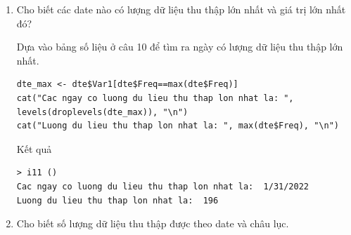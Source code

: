 \documentclass[a4paper]{article}
\theoremstyle{definition}
\begin{document}
\begin{enumerate}[1)]
Đầu tiên chúng ta sẽ tạo một bảng số liệu thống kê dữ liệu theo ngày, sau đó dựa vào bảng số liệu trên để tìm ra ngày có lượng dữ liệu thu thập nhỏ nhất.
\begin{lstlisting}
dte <- table(dataFile$date)
dte <- as.data.frame(dte)
dte_min <- dte$Var1[dte$Freq==min(dte$Freq)]
cat("Cac ngay co luong du lieu thu thap nho nhat la: ", levels(droplevels(dte_min)), "\n")
cat("Luong du lieu thu thap nho nhat la: ", min(dte$Freq), "\n")
\end{lstlisting}
Kết quả
\begin{lstlisting}
> i10 ()
Cac ngay co luong du lieu thu thap nho nhat la:  1/23/2020 2/18/2020
Luong du lieu thu thap nho nhat la:  10 
\end{lstlisting}

\item Cho biết các date nào có lượng dữ liệu thu thập lớn nhất và giá trị lớn nhất đó? 

Dựa vào bảng số liệu ở câu 10 để tìm ra ngày có lượng dữ liệu thu thập lớn nhất.
\begin{lstlisting}
dte_max <- dte$Var1[dte$Freq==max(dte$Freq)]
cat("Cac ngay co luong du lieu thu thap lon nhat la: ", levels(droplevels(dte_max)), "\n")
cat("Luong du lieu thu thap lon nhat la: ", max(dte$Freq), "\n")
\end{lstlisting}
Kết quả
\begin{lstlisting}
> i11 ()
Cac ngay co luong du lieu thu thap lon nhat la:  1/31/2022 
Luong du lieu thu thap lon nhat la:  196 
\end{lstlisting}

\item Cho biết số lượng dữ liệu thu thập được theo date và châu lục. 


\end{enumerate}
\end{document}
